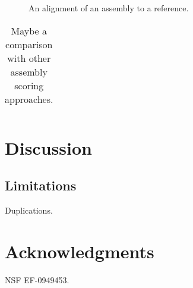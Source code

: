 \documentclass{bioinfo}
\begin{document}
\begin{figure}
\caption{An alignment of an assembly to a reference.}
\end{figure}

\begin{table}
\caption{Maybe a comparison with other assembly scoring approaches.}
\begin{tabular}{l}
\end{tabular}
\end{table}
\section{Discussion}


\subsection{Limitations}

Duplications.

\section{Acknowledgments}

NSF EF-0949453.


\singlespacing


\clearpage
\end{document}
